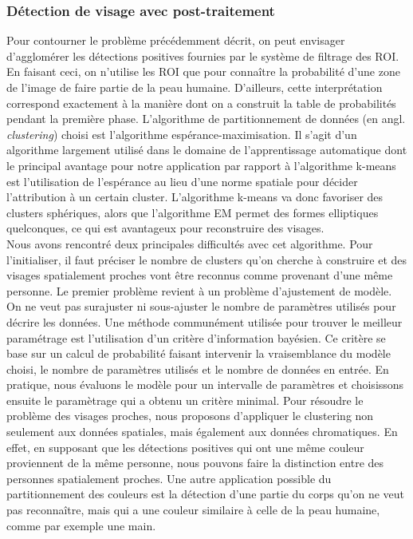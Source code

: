 \documentclass[a4paper,11pt]{article}
\begin{document}
\subsubsection{Détection de visage avec post-traitement}
Pour contourner le problème précédemment décrit, on peut envisager d'agglomérer les détections positives fournies par le système de filtrage des ROI.
En faisant ceci, on n'utilise les ROI que pour connaître la probabilité d'une zone de l'image de faire partie de la peau humaine.
D'ailleurs, cette interprétation correspond exactement à la manière dont on a construit la table de probabilités pendant la première phase.
\newline
\newline
L'algorithme de partitionnement de données (en angl. {\textit{clustering}}) choisi est l'algorithme espérance-maximisation.
Il s'agit d'un algorithme largement utilisé dans le domaine de l'apprentissage automatique dont le principal avantage pour notre application par rapport à l'algorithme k-means est l'utilisation de l'espérance au lieu d'une norme spatiale pour décider l'attribution à un certain cluster.
L'algorithme k-means va donc favoriser des clusters sphériques, alors que l'algorithme EM permet des formes elliptiques quelconques, ce qui est avantageux pour reconstruire des visages.\\
\newline
Nous avons rencontré deux principales difficultés avec cet algorithme. 
Pour l'initialiser, il faut préciser le nombre de clusters qu'on cherche à construire et des visages spatialement proches vont être reconnus comme provenant d'une même personne.
Le premier problème revient à un problème d'ajustement de modèle. On ne veut pas surajuster ni sous-ajuster le nombre de paramètres utilisés pour décrire les données.
Une méthode communément utilisée pour trouver le meilleur paramétrage est l'utilisation d'un critère d'information bayésien.
Ce critère se base sur un calcul de probabilité faisant intervenir la vraisemblance du modèle choisi, le nombre de paramètres utilisés et le nombre de données en entrée.
En pratique, nous évaluons le modèle pour un intervalle de paramètres et choisissons ensuite le paramètrage qui a obtenu un critère minimal.
\newline
\newline
Pour résoudre le problème des visages proches, nous proposons d'appliquer le clustering non seulement aux données spatiales, mais également aux données chromatiques.
En effet, en supposant que les détections positives qui ont une même couleur proviennent de la même personne, nous pouvons faire la distinction entre des personnes spatialement proches.
\newline
\newline
Une autre application possible du partitionnement des couleurs est la détection d'une partie du corps qu'on ne veut pas reconnaître, mais qui a une couleur similaire à celle de la peau humaine, comme par exemple une main.
\end{document}
